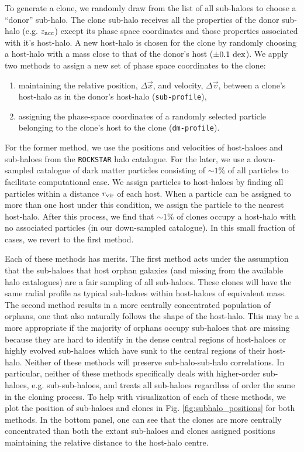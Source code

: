 \documentclass[a4paper,fleqn,usenatbib]{mnras}
\begin{document}
To generate a clone, we randomly draw from the list of all sub-haloes to choose a ``donor'' sub-halo.  The clone sub-halo receives all the properties of the donor sub-halo (e.g. $z_{\rm acc}$) except its phase space coordinates and those properties associated with it's host-halo.  A new host-halo is chosen for the clone by randomly choosing a host-halo with a mass close to that of the donor's host ($\pm 0.1~ {\rm dex}$).  We apply two methods to assign a new set of phase space coordinates to the clone:
\begin{enumerate}
\item maintaining the relative position, $\Delta \vec{x}$, and velocity, $\Delta \vec{v}$, between a clone's host-halo as in the donor's host-halo ({\tt sub-profile}),
\item assigning the phase-space coordinates of a randomly selected particle belonging to the clone's host to the clone ({\tt dm-profile}).
\end{enumerate}
For the former method, we use the positions and velocities of host-haloes and sub-haloes from the {\tt ROCKSTAR} halo catalogue.  For the later, we use a down-sampled catalogue of dark matter particles consisting of $\sim 1\%$ of all particles to facilitate computational ease.  We assign particles to host-haloes by finding all particles within a distance $r_{\rm vir}$ of each host.  When a particle can be assigned to more than one host under this condition, we assign the particle to the nearest host-halo.  After this process, we find that $\sim 1\%$ of clones occupy a host-halo with no associated particles (in our down-sampled catalogue).  In this small fraction of cases, we revert to the first method.   

Each of these methods has merits.  The first method acts under the assumption that the sub-haloes that host orphan galaxies (and missing from the available halo catalogues) are a fair sampling of all sub-haloes.  These clones will have the same radial profile as typical sub-haloes within host-haloes of equivalent mass.  The second method results in a more centrally concentrated population of orphans, one that also naturally follows the shape of the host-halo.  This may be a more appropriate if the majority of orphans occupy sub-haloes that are missing because they are hard to identify in the dense central regions of host-haloes or highly evolved sub-haloes which have sunk to the central regions of their host-halo.  Neither of these methods will preserve sub-halo-sub-halo correlations.  In particular, neither of these methods specifically deals with higher-order sub-haloes, e.g. sub-sub-haloes, and treats all sub-haloes regardless of order the same in the cloning process.  To help with visualization of each of these methods, we plot the position of sub-haloes and clones in Fig. \ref{fig:subhalo_positions} for both methods.  In the bottom panel, one can see that the clones are more centrally concentrated than both the extant sub-haloes and clones assigned positions maintaining the relative distance to the host-halo centre. 
  
\end{document}
